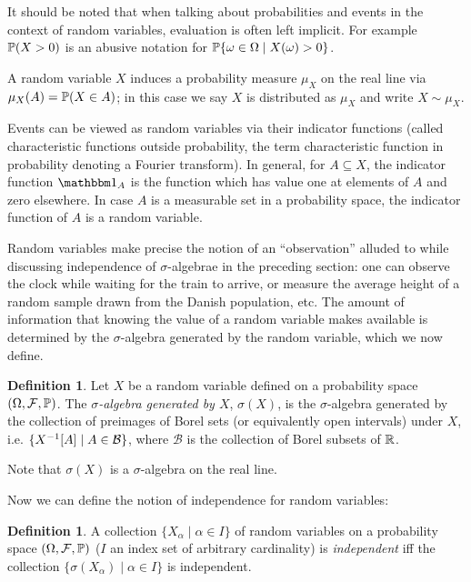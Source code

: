 \documentclass[leqno]{article}
\theoremstyle{definition}
\newtheorem{definition}[theorem]{Definition}
\newcommand{\bldset}[2]{\{{#1}\mid{#2}\}}
\begin{document}
It should be noted that when talking about probabilities and events in the context of random variables, evaluation is often left implicit. For example \linebreak $\P(X > 0)$ is an abusive notation for $\P\bldset{\omega \in \Omega}{X(\omega) > 0}$.

A random variable $X$ induces a probability measure $\mu_X$ on the real line via $\mu_X (A) = \P(X \in A)$; in this case we say $X$ is distributed as $\mu_X$ and write $X \sim \mu_X$.

Events can be viewed as random variables via their indicator functions (called characteristic functions outside probability, the term characteristic function in probability denoting a Fourier transform). In general, for $A \subseteq X$, the indicator function $\mathbbm 1_A$ is the function which has value one at elements of $A$ and zero elsewhere. In case $A$ is a measurable set in a probability space, the indicator function of $A$ is a random variable.

Random variables make precise the notion of an ``observation'' alluded to while discussing independence of $\sigma$-algebrae in the preceding section: one can observe the clock while waiting for the train to arrive, or measure the average height of a random sample drawn from the Danish population, etc. The amount of information that knowing the value of a random variable makes available is determined by the $\sigma$-algebra generated by the random variable, which we now define.

\begin{definition}
Let $X$ be a random variable defined on a probability space $(\Omega, \mathcal F, \P)$. The {\em $\sigma$-algebra generated by $X$}, $\sigma(X)$, is the $\sigma$-algebra generated by the collection of preimages of Borel sets (or equivalently open intervals) under $X$, i.e. $\bldset{X\inv[A]}{A \in \mathcal B}$, where $\mathcal B$ is the collection of Borel subsets of $\R$.
\end{definition}

Note that $\sigma(X)$ is a $\sigma$-algebra on the real line.

Now we can define the notion of independence for random variables:

\begin{definition}
A collection $\bldset{X_\alpha}{\alpha \in I}$ of random variables on a probability space $(\Omega, \mathcal F, \P)$ ($I$ an index set of arbitrary cardinality) is {\em independent} iff the collection $\bldset{\sigma(X_\alpha)}{\alpha \in I}$ is independent.
\end{definition}
\end{document}
